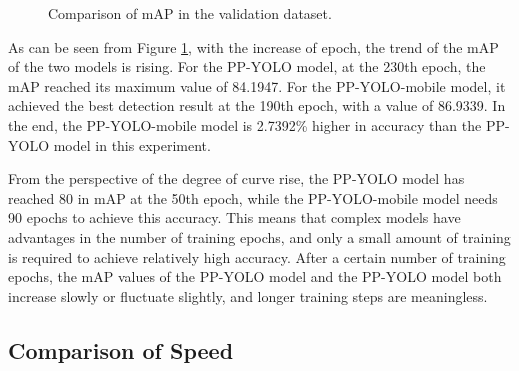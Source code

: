 \documentclass[sensors,article,submit,moreauthors,pdftex]{Definitions/mdpi}
\begin{document}
\begin{paracol}{2}
\begin{figure}[htbp]
\centering
{}
\quad
{}
\caption{Comparison of mAP in the validation dataset.}
\label{fig:map}
\end{figure}

As can be seen from Figure \ref{fig:map}, with the increase of epoch, the trend of the mAP of the two models is rising. For the PP-YOLO model, at the 230th epoch, the mAP reached its maximum value of 84.1947. For the PP-YOLO-mobile model, it achieved the best detection result at the 190th epoch, with a value of 86.9339. In the end, the PP-YOLO-mobile model is 2.7392\% higher in accuracy than the PP-YOLO model in this experiment.



From the perspective of the degree of curve rise, the PP-YOLO model has reached 80 in mAP at the 50th epoch, while the PP-YOLO-mobile model needs 90 epochs to achieve this accuracy. This means that complex models have advantages in the number of training epochs, and only a small amount of training is required to achieve relatively high accuracy. After a certain number of training epochs, the mAP values of the PP-YOLO model and the PP-YOLO model both increase slowly or fluctuate slightly, and longer training steps are meaningless.



\subsection{Comparison of Speed}


\end{paracol}
\end{document}
